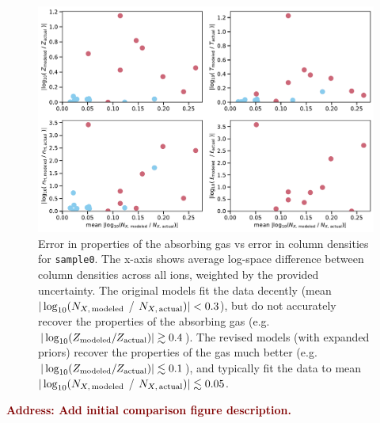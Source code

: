 \documentclass[fleqn,usenatbib]{mnras}
\newcommand{\todo}[1]{\textcolor{Maroon}{\textbf{Address: #1}}}
\begin{document}
\begin{figure}
    \centering
    \includegraphics[width=\textwidth]{figures/sample0/error_vs_error.pdf}
    \caption{
    Error in properties of the absorbing gas vs error in column densities for \texttt{sample0}.
    The x-axis shows average log-space difference between column densities across all ions, weighted by the provided uncertainty.
    The original models fit the data decently (mean $\vert \log_{10}( N_{X,\,{\rm modeled}}$ / $N_{X,\,{\rm actual}}) \vert < 0.3$), but do not accurately recover the properties of the absorbing gas (e.g. $\vert \log_{10}( Z_{\rm modeled} / Z_{\rm actual}) \vert \gtrsim 0.4$).
    The revised models (with expanded priors) recover the properties of the gas much better (e.g. $\vert \log_{10}( Z_{\rm modeled} / Z_{\rm actual}) \vert \lesssim 0.1$), and typically fit the data to mean $\vert \log_{10}( N_{X,\,{\rm modeled}}$ / $N_{X,\,{\rm actual}}) \vert \lesssim 0.05$.
    }
    \label{f: error vs error}
\end{figure}

\todo{Add initial comparison figure description.}
\end{document}
